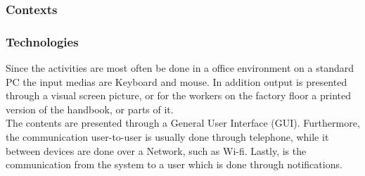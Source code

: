 \subsubsection*{Contexts}




\subsubsection*{Technologies}
Since the activities are most often be done in a office environment on a standard PC the input medias are Keyboard and mouse.
In addition output is presented through a visual screen picture, or for the workers on the factory floor a printed version of the handbook, or parts of it.
\\\indent
The contents are presented through a General User Interface (GUI).
Furthermore, the communication user-to-user is usually done through telephone, while it between devices are done over a Network, such as Wi-fi.
Lastly, is the communication from the system to a user which is done through notifications.

